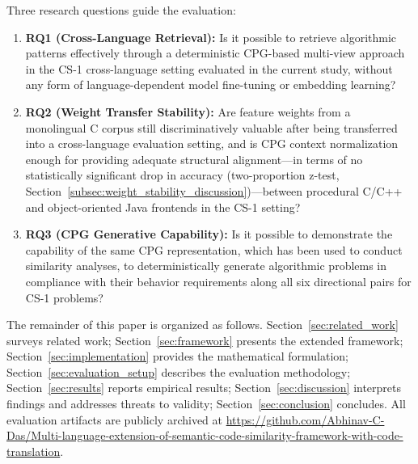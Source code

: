 Three research questions guide the evaluation:
\begin{enumerate}
    \item \textbf{RQ1 (Cross-Language Retrieval):} Is it possible to retrieve algorithmic patterns effectively through a deterministic CPG-based multi-view approach in the CS-1 cross-language setting evaluated in the current study, without any form of language-dependent model fine-tuning or embedding learning?
    \item \textbf{RQ2 (Weight Transfer Stability):} Are feature weights from a monolingual C corpus still discriminatively valuable after being transferred into a cross-language evaluation setting, and is CPG context normalization enough for providing adequate structural alignment---in terms of no statistically significant drop in accuracy (two-proportion z-test, Section~\ref{subsec:weight_stability_discussion})---between procedural C/C++ and object-oriented Java frontends in the CS-1 setting?
    \item \textbf{RQ3 (CPG Generative Capability):} Is it possible to demonstrate the capability of the same CPG representation, which has been used to conduct similarity analyses, to deterministically generate algorithmic problems in compliance with their behavior requirements along all six directional pairs for CS-1 problems?
\end{enumerate}

The remainder of this paper is organized as follows. Section~\ref{sec:related_work} surveys related work; Section~\ref{sec:framework} presents the extended framework; Section~\ref{sec:implementation} provides the mathematical formulation; Section~\ref{sec:evaluation_setup} describes the evaluation methodology; Section~\ref{sec:results} reports empirical results; Section~\ref{sec:discussion} interprets findings and addresses threats to validity; Section~\ref{sec:conclusion} concludes. All evaluation artifacts are publicly archived at \url{https://github.com/Abhinav-C-Das/Multi-language-extension-of-semantic-code-similarity-framework-with-code-translation}.
